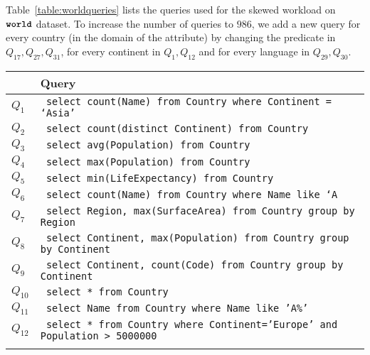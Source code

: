 Table~\ref{table:worldqueries} lists the queries used for the skewed workload on $\texttt{\bfseries world}$ dataset. To increase the number of queries to $986$, we add a new query for every country (in the domain of the attribute) by changing the predicate in $Q_{17}, Q_{27}, Q_{31}$, for every continent in $Q_1, Q_{12}$ and for every language in $Q_{29}, Q_{30}$.

\begin{table}
	\begin{tabular}{l|L{12cm}}
		\toprule
		& \textbf{Query}  \\
		\midrule
		
		$Q_1$ & \texttt{
			select count(Name) from Country where Continent = `Asia'
		} \\ \hdashline 
		
		$Q_2$ & \texttt{
			select count(distinct Continent) from Country
		} \\ \hdashline
		
		$Q_3$ & \texttt{
			select avg(Population) from Country 
		} \\ \hdashline
		
		$Q_4$ & \texttt{
			select max(Population) from Country
		} \\ \hdashline
		
		$Q_5$ & \texttt{
			select min(LifeExpectancy) from Country
		} \\ \hdashline
		
		$Q_6$ & \texttt{
			select count(Name) from Country where Name like `A%
		} \\ \hdashline
		
		$Q_7$ & \texttt{
			select Region, max(SurfaceArea) from Country group by Region 
		} \\ \hdashline
		
		$Q_8$ & \texttt{
			select Continent, max(Population) from Country group by Continent
		} \\ \hdashline
		
		$Q_9$ & \texttt{
			select Continent, count(Code) from Country group by Continent
		}\\
		
		
		$Q_{10}$ & \texttt{
			select * from Country
		} \\ \hdashline
		
		$Q_{11}	$ & \texttt{
			select Name from Country where Name like 'A\%'
		} \\ \hdashline
		
		$Q_{12}$ & \texttt{
			select * from Country where Continent='Europe' and Population > 5000000 
		} \\ \hdashline
		

\end{tabular}
\end{table}
